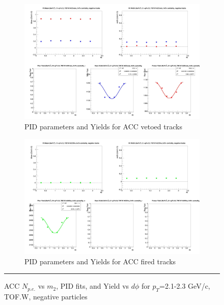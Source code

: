 \begin{figure}[H]
  \ContinuedFloat
    \begin{subfigure}{1\textwidth}
    \includegraphics[width=1\textwidth]{hiptfits/neg/fitParams_tof2_cent0_ch0_pT-21-23.jpg}
    \caption{PID parameters and Yields for ACC vetoed tracks}
    \end{subfigure}    
    \begin{subfigure}{1\textwidth}
    \includegraphics[width=1\textwidth]{hiptfits/neg/fitParams_tof3_cent0_ch0_pT-21-23.jpg}
    \caption{PID parameters and Yields for ACC fired tracks}
    \end{subfigure} 
    \rule{35em}{0.5pt}
  \caption[ACC $N_{p.e.}$ vs $m_2$, PID fits, and Yield vs $d\phi$ for $p_T$=2.1-2.3 GeV/c, TOF.W, negative particles]{ACC $N_{p.e.}$ vs $m_2$, PID fits, and Yield vs $d\phi$ for $p_T$=2.1-2.3 GeV/c, TOF.W, negative particles}
  \label{fig:acc21-23neg}
\end{figure}


